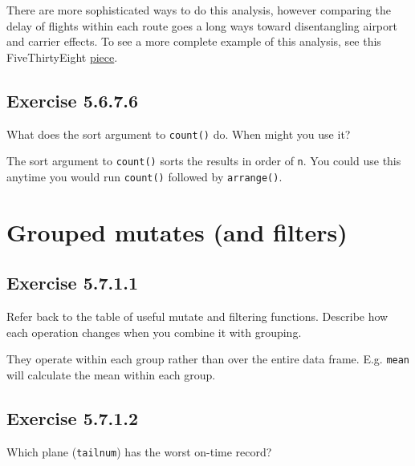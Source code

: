 \documentclass[]{book}
\theoremstyle{plain}
\theoremstyle{remark}
\begin{document}
There are more sophisticated ways to do this analysis, however comparing the delay of flights within each route goes a long ways toward disentangling airport and carrier effects.
To see a more complete example of this analysis, see this FiveThirtyEight \href{http://fivethirtyeight.com/features/the-best-and-worst-airlines-airports-and-flights-summer-2015-update/}{piece}.

\hypertarget{exercise-5.6.7.6}{%
\subsection*{\texorpdfstring{Exercise {5.6.7.6}}{Exercise 5.6.7.6}}\label{exercise-5.6.7.6}}

What does the sort argument to \texttt{count()} do. When might you use it?

The sort argument to \texttt{count()} sorts the results in order of \texttt{n}.
You could use this anytime you would run \texttt{count()} followed by \texttt{arrange()}.

\hypertarget{grouped-mutates-and-filters}{%
\section{Grouped mutates (and filters)}\label{grouped-mutates-and-filters}}

\hypertarget{exercise-5.7.1.1}{%
\subsection*{\texorpdfstring{Exercise {5.7.1.1}}{Exercise 5.7.1.1}}\label{exercise-5.7.1.1}}

Refer back to the table of useful mutate and filtering functions. Describe how each operation changes when you combine it with grouping.

They operate within each group rather than over the entire data frame. E.g. \texttt{mean} will calculate the mean within each group.

\hypertarget{exercise-5.7.1.2}{%
\subsection*{\texorpdfstring{Exercise {5.7.1.2}}{Exercise 5.7.1.2}}\label{exercise-5.7.1.2}}

Which plane (\texttt{tailnum}) has the worst on-time record?
\end{document}
